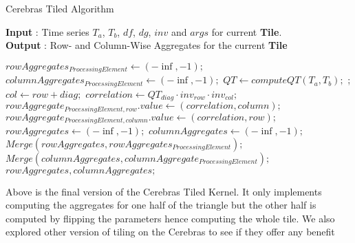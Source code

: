 \begin{algorithm}
    \caption{Cerebras Tiled Algorithm}
    \label{tiled_algorithm}
    \hspace*{\algorithmicindent} \textbf{Input} : Time series $T_a$, $T_b$, $df$, $dg$, $inv$ and $args$ for current \textbf{Tile}.\\
    \hspace*{\algorithmicindent} \textbf{Output} : Row- and Column-Wise Aggregates for the current \textbf{Tile}
    \begin{algorithmic}[1]
            \State $rowAggregates_{ProcessingElement} \gets (-\inf, -1);$
            \State $columnAggregates_{ProcessingElement} \gets (-\inf, -1);$
            \State $QT \gets computeQT(T_a, T_b);$
                ;
                    \State $col \gets row + diag;$
                    \State $correlation \gets QT_{diag} \cdot inv_{row} \cdot inv_{col};$
                        \State $rowAggregate_{ProcessingElement, row}.value \gets (correlation, column);$
                    \EndIf
                        \State $rowAggregate_{ProcessingElement, column}.value \gets (correlation, row);$
                    \EndIf
                \EndFor
            \EndFor
        \EndFor
        \State $rowAggregates \gets (-\inf, -1);$
        \State $columnAggregates \gets (-\inf, -1);$
            \State $Merge(rowAggregates, rowAggregates_{ProcessingElement});$
            \State $Merge(columnAggregates, columnAggregate_{ProcessingElement});$
        \EndFor\\
        \Return $rowAggregates, columnAggregates;$
    \end{algorithmic}
\end{algorithm}

Above is the final version of the Cerebras Tiled Kernel. It only implements computing the aggregates for one half of the triangle but the other half is computed by flipping the parameters hence computing the whole tile.
We also explored other version of tiling on the Cerebras to see if they offer any benefit 
\clearpage

